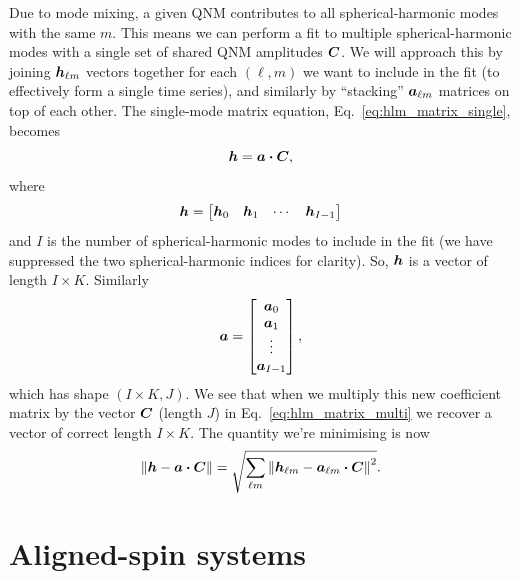 Due to mode mixing, a given QNM contributes to all spherical-harmonic modes with the same $m$. 
This means we can perform a fit to multiple spherical-harmonic modes with a single set of shared QNM amplitudes $\vb*{C}$.
We will approach this by joining $\vb*{h}_{\ell m}$ vectors together for each $(\ell, m)$ we want to include in the fit (to effectively form a single time series), and similarly by ``stacking'' $\vb*{a}_{\ell m}$ matrices on top of each other.
The single-mode matrix equation, Eq.~\ref{eq:hlm_matrix_single}, becomes
\begin{equation}\label{eq:hlm_matrix_multi}
    \vb*{h} = \vb*{a} \vdot \vb*{C},
\end{equation}
where
\begin{equation}
    \vb*{h} = 
    \begin{bmatrix}
    \vb*{h}_0 & \vb*{h}_1 & \cdots & \vb*{h}_{I-1}
    \end{bmatrix}
\end{equation}
and $I$ is the number of spherical-harmonic modes to include in the fit (we have suppressed the two spherical-harmonic indices for clarity). So, $\vb*{h}$ is a vector of length $I \times K$.
Similarly
\begin{equation}
    \vb*{a} = 
    \begin{bmatrix}
    \vb*{a}_0 \\ \vb*{a}_1 \\ \vdots \\ \vb*{a}_{I-1}
    \end{bmatrix},
\end{equation}
which has shape $(I \times K, J)$. 
We see that when we multiply this new coefficient matrix by the vector $\vb*{C}$ (length $J$) in Eq.~\ref{eq:hlm_matrix_multi} we recover a vector of correct length $I \times K$.
The quantity we're minimising is now
\begin{equation}
    \norm{\vb*{h} - \vb*{a} \vdot \vb*{C}} = \sqrt{ \sum_{\ell m} \norm{\vb*{h}_{\ell m} - \vb*{a}_{\ell m} \vdot \vb*{C}}^2 }.
\end{equation}


\section{Aligned-spin systems}\label{aligned-spin-section}

